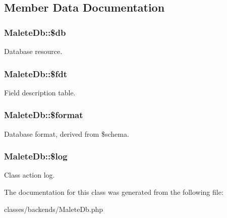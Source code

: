 \subsection{Member Data Documentation}
\hypertarget{classMaleteDb_a4b970df3631d2763f001c96ee417f27a}{
\subsubsection[{\$db}]{\setlength{\rightskip}{0pt plus 5cm}MaleteDb::\$db}}
\label{classMaleteDb_a4b970df3631d2763f001c96ee417f27a}
Database resource. \hypertarget{classMaleteDb_af2cd60ce81381edc3ca09a6812cf79fd}{
\subsubsection[{\$fdt}]{\setlength{\rightskip}{0pt plus 5cm}MaleteDb::\$fdt}}
\label{classMaleteDb_af2cd60ce81381edc3ca09a6812cf79fd}
Field description table. \hypertarget{classMaleteDb_a833fed4faae9537306053ee966c06197}{
\subsubsection[{\$format}]{\setlength{\rightskip}{0pt plus 5cm}MaleteDb::\$format}}
\label{classMaleteDb_a833fed4faae9537306053ee966c06197}
Database format, derived from \$schema. \hypertarget{classMaleteDb_ae1c8cefd1a6e661fb03c214f47336368}{
\subsubsection[{\$log}]{\setlength{\rightskip}{0pt plus 5cm}MaleteDb::\$log}}
\label{classMaleteDb_ae1c8cefd1a6e661fb03c214f47336368}
Class action log. 

The documentation for this class was generated from the following file:\begin{DoxyCompactItemize}
\item 
classes/backends/MaleteDb.php\end{DoxyCompactItemize}
